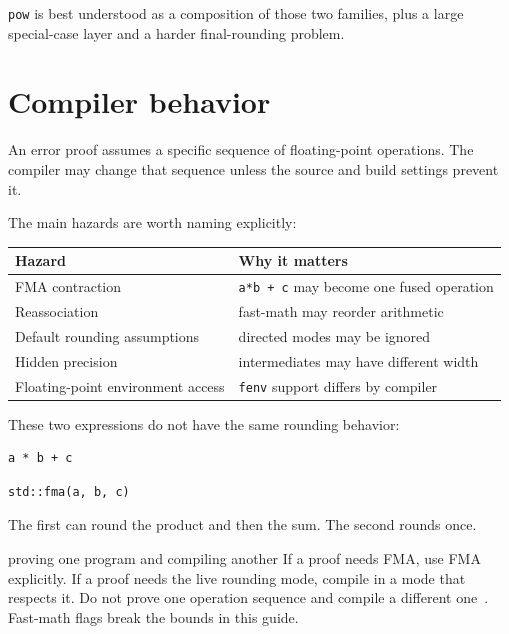 \documentclass[manuscript, nonacm]{acmart}
\begin{document}
  \texttt{pow} is best understood as a composition of those two families, plus
  a large special-case layer and a harder final-rounding problem.



  \section{Compiler behavior}
  \label{sec:compiler}

  An error proof assumes a specific sequence of floating-point operations. The
  compiler may change that sequence unless the source and build settings prevent
  it.

  The main hazards are worth naming explicitly:

  \begin{table}[tbp]
    \centering
    \begin{tabular}{ll}
      \toprule
      Hazard                            & Why it matters                                  \\
      \midrule
      FMA contraction                   & \texttt{a*b + c} may become one fused operation \\
      Reassociation                     & fast-math may reorder arithmetic                \\
      Default rounding assumptions      & directed modes may be ignored                   \\
      Hidden precision                  & intermediates may have different width          \\
      Floating-point environment access & \texttt{fenv} support differs by compiler       \\
      \bottomrule
    \end{tabular}
  \end{table}

  These two expressions do not have the same rounding behavior:
  \begin{lstlisting}[style=cpp]
a * b + c
  \end{lstlisting}
  \begin{lstlisting}[style=cpp]
std::fma(a, b, c)
  \end{lstlisting}

  The first can round the product and then the sum. The second rounds once.

  \begin{pitfall}{proving one program and compiling another}
    If a proof needs FMA, use FMA explicitly. If a proof needs the live
    rounding mode, compile in a mode that respects it. Do not prove one
    operation sequence and compile a different one~\cite{handbook}.
    Fast-math flags break the bounds in this guide.
  \end{pitfall}
\end{document}
